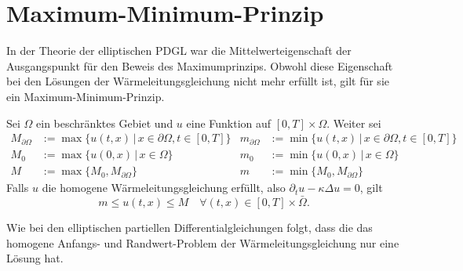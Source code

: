 %
%
%
\section{Maximum-Minimum-Prinzip}
In der Theorie der elliptischen PDGL war die Mittelwerteigenschaft
der Ausgangspunkt für den Beweis des Maximumprinzips. Obwohl
diese Eigenschaft bei den 
Lösungen der Wärmeleitungsgleichung nicht mehr erfüllt ist,
gilt für sie ein Maximum-Minimum-Prinzip.
\begin{satz}
Sei $\Omega$ ein beschränktes Gebiet und
$u$ eine Funktion auf $[0,T]\times\Omega$.
Weiter sei
\begin{align*}
M_{\partial \Omega}&:=\max\{u(t,x)\,|\,x\in\partial\Omega, t\in[0,T]\}
&
m_{\partial \Omega}&:=\min\{u(t,x)\,|\,x\in\partial\Omega, t\in[0,T]\}
\\
M_0&:=
\max\{u(0,x)\,|\,x\in\Omega\}
&
m_0&:=
\min\{u(0,x)\,|\,x\in\Omega\}
\\
M&:=\max\{M_0,M_{\partial\Omega}\}
&
m&:=\min\{M_0,M_{\partial\Omega}\}
\end{align*}
Falls $u$ die homogene
Wärmeleitungsgleichung erfüllt, also $\partial_tu-\kappa\Delta u=0$,
gilt
\[
m\le u(t,x)\le M\quad\forall(t,x)\in[0,T]\times\bar\Omega.
\]
\end{satz}
Wie bei den elliptischen partiellen Differentialgleichungen folgt, dass
die das homogene Anfangs- und Randwert-Problem der Wärmeleitungsgleichung
nur eine Lösung hat.

